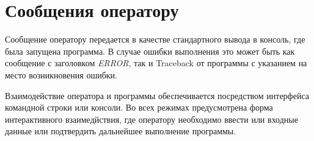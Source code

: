 \newpage
\section{Сообщения оператору}

Сообщение оператору передается в качестве стандартного вывода в консоль, где была запущена программа. В случае ошибки выполнения это может быть как сообщение с заголовком \textit{ERROR}, так и Traceback от программы с указанием на место возникновения ошибки.

Взаимодействие оператора и программы обеспечивается посредством интерфейса командной строки или консоли.
Во всех режимах предусмотрена форма интерактивного взаимедйствия, где оператору необходимо ввести или входные данные или подтвердить дальнейшее выполнение программы.
